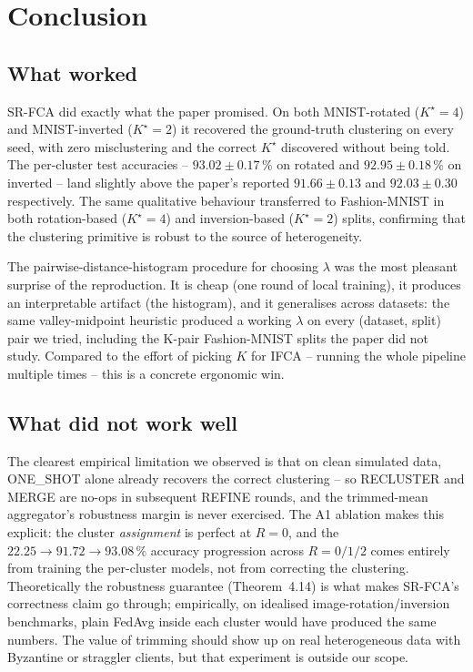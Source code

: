 \chapter{Conclusion}\label{ch:conclusion}

\section{What worked}\label{sec:conclusion-what-worked}

SR-FCA did exactly what the paper promised. On both MNIST-rotated ($K^\star = 4$) and MNIST-inverted ($K^\star = 2$) it recovered the ground-truth clustering on every seed, with zero misclustering and the correct $K^\star$ discovered without being told. The per-cluster test accuracies -- $93.02 \pm 0.17\,\%$ on rotated and $92.95 \pm 0.18\,\%$ on inverted -- land slightly above the paper's reported $91.66 \pm 0.13$ and $92.03 \pm 0.30$ respectively. The same qualitative behaviour transferred to Fashion-MNIST in both rotation-based ($K^\star = 4$) and inversion-based ($K^\star = 2$) splits, confirming that the clustering primitive is robust to the source of heterogeneity.

The pairwise-distance-histogram procedure for choosing $\lambda$ was the most pleasant surprise of the reproduction. It is cheap (one round of local training), it produces an interpretable artifact (the histogram), and it generalises across datasets: the same valley-midpoint heuristic produced a working $\lambda$ on every (dataset, split) pair we tried, including the K-pair Fashion-MNIST splits the paper did not study. Compared to the effort of picking $K$ for IFCA -- running the whole pipeline multiple times -- this is a concrete ergonomic win.

\section{What did not work well}\label{sec:conclusion-did-not-work}

The clearest empirical limitation we observed is that on clean simulated data, ONE\_SHOT alone already recovers the correct clustering -- so RECLUSTER and MERGE are no-ops in subsequent REFINE rounds, and the trimmed-mean aggregator's robustness margin is never exercised. The A1 ablation makes this explicit: the cluster \emph{assignment} is perfect at $R = 0$, and the $22.25 \to 91.72 \to 93.08\,\%$ accuracy progression across $R = 0/1/2$ comes entirely from training the per-cluster models, not from correcting the clustering. Theoretically the robustness guarantee (Theorem~4.14) is what makes SR-FCA's correctness claim go through; empirically, on idealised image-rotation/inversion benchmarks, plain FedAvg inside each cluster would have produced the same numbers. The value of trimming should show up on real heterogeneous data with Byzantine or straggler clients, but that experiment is outside our scope.


